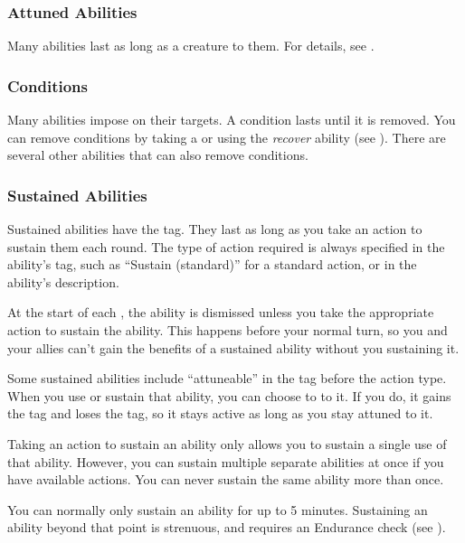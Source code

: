     \subsubsection{Attuned Abilities}
      Many abilities last as long as a creature  to them.
      For details, see .

    \subsubsection{Conditions}\label{Conditions}
      Many abilities impose  on their targets.
      A condition lasts until it is removed.
      You can remove conditions by taking a  or using the \textit{recover} ability (see ).
      There are several other abilities that can also remove conditions.

    \subsubsection{Sustained Abilities}\label{Sustained Abilities}
      Sustained abilities have the  tag.
      They last as long as you take an action to sustain them each round.
      The type of action required is always specified in the ability's tag, such as ``Sustain (standard)'' for a standard action, or in the ability's description.

      At the start of each , the ability is dismissed unless you take the appropriate action to sustain the ability.
      This happens before your normal turn, so you and your allies can't gain the benefits of a sustained ability without you sustaining it.

      Some sustained abilities include ``attuneable'' in the tag before the action type.
      When you use or sustain that ability, you can choose to  to it.
      If you do, it gains the  tag and loses the  tag, so it stays active as long as you stay attuned to it.

      Taking an action to sustain an ability only allows you to sustain a single use of that ability.
      However, you can sustain multiple separate abilities at once if you have available actions.
      You can never sustain the same ability more than once.

      You can normally only sustain an ability for up to 5 minutes.
      Sustaining an ability beyond that point is strenuous, and requires an Endurance check (see ).

